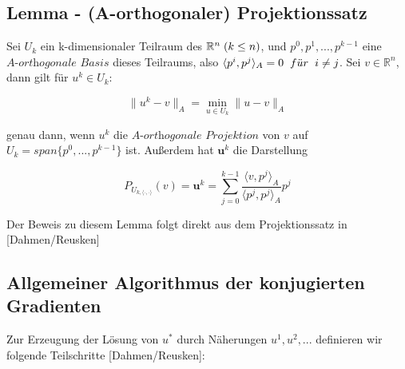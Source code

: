 
\subsection{Lemma - (A-orthogonaler) Projektionssatz}\label{s.Projektionssatz}

Sei $U_{k}$ ein k-dimensionaler Teilraum des $\mathbb{R}^{n} \hspace{1mm} (k \le n)$, und $p^{0}, p^{1},...,p^{k-1}$ eine $\textit{A-orthogonale Basis}$ dieses Teilraums, also $\langle p^{i}, p^{j} \rangle _{A} = 0 \hspace{2mm} f\ddot{u}r \hspace{2mm} i \ne j$. Sei $v \in \mathbb{R}^{n}$, dann gilt für $u^{k} \in U_{k}$:

\begin{equation}
\|u^{k} - v\|_{A} = \underset{u \in U_{k}}{\min} \|u - v\|_{A}
\end{equation}

genau dann, wenn $u^{k}$ die $\textit{A-orthogonale Projektion}$ von $v$ auf $U_{k} = span\{p^{0},...,p^{k-1}\}$ ist. Außerdem hat $\textbf{u}^{k}$ die Darstellung

\begin{equation}
P_{U_{k,\langle \cdot,\cdot \rangle}}(v) = \textbf{u}^{k} = \sum_{j=0}^{k-1} \frac {\langle v, p^{j} \rangle _{A}} {\langle p^{j}, p^{j} \rangle _{A}} p^{j}
\end{equation}

Der Beweis zu diesem Lemma folgt direkt aus dem Projektionssatz in [Dahmen/Reusken]

\subsection{Allgemeiner Algorithmus der konjugierten Gradienten}\label{ss.Allgemeiner CG-Algorithmus}

Zur Erzeugung der Lösung von $u^{*}$ durch Näherungen $u^{1}, u^{2},...$ definieren wir folgende Teilschritte [Dahmen/Reusken]:

